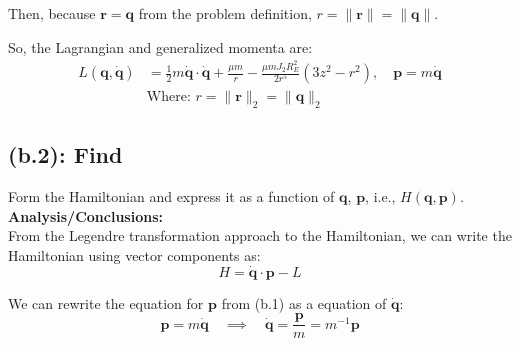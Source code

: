 \documentclass[titlepage]{article}
\begin{document}
Then, because $\boldsymbol{r}=\boldsymbol{q}$ from the problem definition, $r=\|\boldsymbol{r}\|=\|\boldsymbol{q}\|$. \\

\begin{mdframed}[linewidth=1pt, innertopmargin=10pt, innerbottommargin=10pt]
	So, the Lagrangian and generalized momenta are:
	\begin{equation}
		\begin{split}
			L(\boldsymbol{q},\dot{\boldsymbol{q}})&=\frac{1}{2}m\dot{\boldsymbol{q}}\cdot\dot{\boldsymbol{q}}+\frac{\mu m}{r}-\frac{\mu mJ_2R_E^2}{2r^5}\left(3z^2-r^2\right),\quad\boldsymbol{p}=m\dot{\boldsymbol{q}} \\
			&\text{Where: }r=\|\boldsymbol{r}\|_2=\|\boldsymbol{q}\|_2
		\end{split}
	\end{equation}
\end{mdframed}

\subsection*{(b.2): Find}

Form the Hamiltonian and express it as a function of $\boldsymbol{q}$, $\boldsymbol{p}$, i.e., $H(\boldsymbol{q},\boldsymbol{p})$. \\

\textbf{Analysis/Conclusions:}\\

From the Legendre transformation approach to the Hamiltonian, we can write the Hamiltonian using vector components as:
\begin{equation}
	H=\dot{\boldsymbol{q}}\cdot\boldsymbol{p}-L
	\label{eq:vectorhamiltonian}
\end{equation}

We can rewrite the equation for $\boldsymbol{p}$ from (b.1) as a equation of $\dot{\boldsymbol{q}}$:
\begin{equation}
	\boldsymbol{p}=m\dot{\boldsymbol{q}}\quad\implies\quad\dot{\boldsymbol{q}}=\frac{\boldsymbol{p}}{m}=m^{-1}\boldsymbol{p}
\end{equation} 
\end{document}
